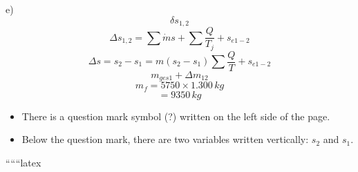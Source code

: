 e) \\
\[
\delta s_{1,2}
\]
\[
\Delta s_{1,2} = \sum \dot{m} s + \sum \frac{Q}{T_j} + s_{e1-2}
\]
\[
\Delta s = s_2 - s_1 = m (s_2 - s_1) \sum \frac{Q}{T} + s_{e1-2}
\]
\[
m_{ges1} + \Delta m_{12}
\]
\[
m_f = 5750 \times 1.300 \, kg
\]
\[
= 9350 \, kg
\]

\begin{itemize}
    \item There is a question mark symbol (?) written on the left side of the page.
    \item Below the question mark, there are two variables written vertically: \( s_2 \) and \( s_1 \).
\end{itemize}

``````latex